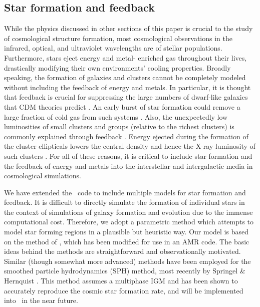 \subsection{Star formation and feedback}
\label{sec.ov.star}


While the physics discussed in other sections of this paper is crucial to the study of
cosmological structure formation, most cosmological observations in
the infrared, optical, and ultraviolet wavelengths are of
stellar populations.  Furthermore, stars eject energy and metal-
enriched gas throughout their lives, drastically modifying their own 
environments' cooling properties.  Broadly speaking, the formation of galaxies and clusters cannot be completely
modeled without including the feedback of energy and metals.  In particular,
it is thought that feedback is crucial for suppressing the large numbers of
dwarf-like galaxies that CDM theories predict 
\citep{1991ApJ...381...14L,1991ApJ...379...52W}.  An early
burst of star formation could remove a large fraction of cold gas from such systems
\citep{1978MNRAS.183..341W,1991ApJ...367...45C}.  Also, the unexpectedly 
low luminosities of small clusters and
groups (relative to the richest clusters) is commonly explained through feedback
\citep{1991ApJ...383..104K}.  Energy ejected during the formation of the cluster ellipticals 
lowers the central density and hence the X-ray luminosity of such clusters 
 \citep{1997ApJ...484L..21C}.  For all of these reasons, it is
 critical to include star formation and the feedback of energy and
 metals into the interstellar and intergalactic media in cosmological simulations.


We have extended the \enzo\ code to include multiple models for star formation
and feedback.  It is difficult to directly simulate the formation of individual
stars in the context of simulations of galaxy formation and evolution due
to the immense computational cost.  Therefore, we adopt a parametric method which attempts
to model star forming regions in a plausible but heuristic way.  
Our model is based on the method of  \citet{CO1992}, which 
has been modified for use in an AMR code.  The basic
ideas behind the methods are straightforward and observationally motivated.
Similar (though somewhat more advanced) methods have been employed for the 
smoothed particle hydrodynamics
(SPH) method, most recently by Springel \& Hernquist 
\citep{sh03a,sh03b,hs03}. This 
method assumes a multiphase IGM and has been shown to accurately reproduce the cosmic star
formation rate, and will be implemented into \enzo\ in the near future.

